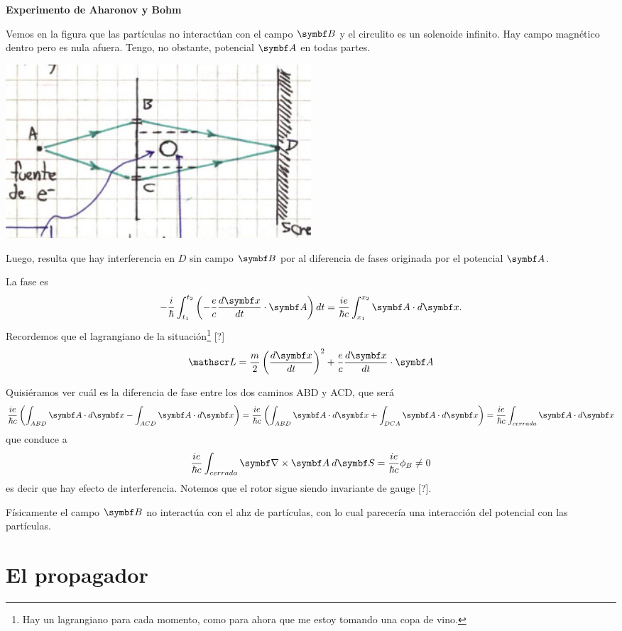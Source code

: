 \documentclass[10pt,oneside]{CBFT_book}
\begin{document}
\begin{ejemplo}{\bf Experimento de Aharonov y Bohm}

Vemos en la figura que las partículas no interactúan con el campo $\vb B$ y el circulito es un solenoide
infinito. Hay campo magnético dentro pero es nula afuera. Tengo, no obstante, potencial $\vb A$ en todas
partes.

\includegraphics[width=0.5\textwidth]{images/fig_ft2_aharonov_bohm.jpg} 

Luego, resulta que hay interferencia en $D$ sin campo $\vb B$ por al diferencia de fases originada 
por el potencial $\vb A$.

La fase es
\[
	- \frac{i}{\hbar} \int_{t_1}^{t_2} \left( - \frac{e}{c} \dtot{\vb x}{t} \cdot \vb A\right) dt=
	\frac{i e}{\hbar c} \int_{x_1}^{x_2} \vb A \cdot d\vb x.
\]
Recordemos que el lagrangiano de la situación\footnote{Hay un lagrangiano para cada momento, como para ahora
que me estoy tomando una copa de vino.} [?]
\[
	\Lag = \frac{m}{2} \Dtot{\vb x}{t}^2 + \frac{e}{c} \dtot{\vb x}{t}\cdot\vb A
\]

Quisiéramos ver cuál es la diferencia de fase entre los dos caminos ABD y ACD, que será
\[
	\frac{ie}{\hbar c} \left( \int_{ABD} \vb A\cdot d\vb x - \int_{ACD} \vb A\cdot d\vb x \right) =
	\frac{ie}{\hbar c} \left( \int_{ABD} \vb A\cdot d\vb x + \int_{DCA} \vb A\cdot d\vb x \right) =
	\frac{ie}{\hbar c}  \int_{cerrada} \vb A\cdot d\vb x
\]
que conduce a
\[
	\frac{ie}{\hbar c}  \int_{cerrada} \rotorm{A} \: d\vb S = \frac{ie}{\hbar c} \phi_B \neq 0
\]
es decir que hay efecto de interferencia. Notemos que el rotor sigue siendo invariante de gauge [?].

Físicamente el campo $\vb B$ no interactúa con el ahz de partículas, con lo cual parecería una interacción
del potencial con las partículas.
 
\end{ejemplo}


\section{El propagador}
\end{document}
